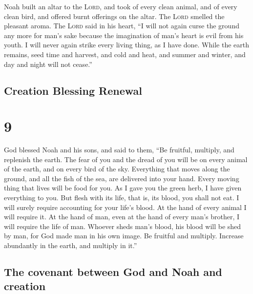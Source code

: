  Noah built an altar to the \textsc{Lord}, and took of
every clean animal, and of every clean bird, and offered burnt offerings
on the altar.  The \textsc{Lord} smelled the pleasant
aroma. The \textsc{Lord} said in his heart, ``I will not again curse the
ground any more for man's sake because the imagination of man's heart is
evil from his youth. I will never again strike every living thing, as I
have done.  While the earth remains, seed time and
harvest, and cold and heat, and summer and winter, and day and night
will not cease.''

\hypertarget{creation-blessing-renewal}{%
\subsection{Creation Blessing Renewal}\label{creation-blessing-renewal}}

\hypertarget{section-8}{%
\section{9}\label{section-8}}

 God blessed Noah and his sons, and said to them, ``Be
fruitful, multiply, and replenish the earth.  The fear of
you and the dread of you will be on every animal of the earth, and on
every bird of the sky. Everything that moves along the ground, and all
the fish of the sea, are delivered into your hand.  Every
moving thing that lives will be food for you. As I gave you the green
herb, I have given everything to you.  But flesh with its
life, that is, its blood, you shall not eat.  I will
surely require accounting for your life's blood. At the hand of every
animal I will require it. At the hand of man, even at the hand of every
man's brother, I will require the life of man.  Whoever
sheds man's blood, his blood will be shed by man, for God made man in
his own image.  Be fruitful and multiply. Increase
abundantly in the earth, and multiply in it.''

\hypertarget{the-covenant-between-god-and-noah-and-creation}{%
\subsection{The covenant between God and Noah and
creation}\label{the-covenant-between-god-and-noah-and-creation}}

